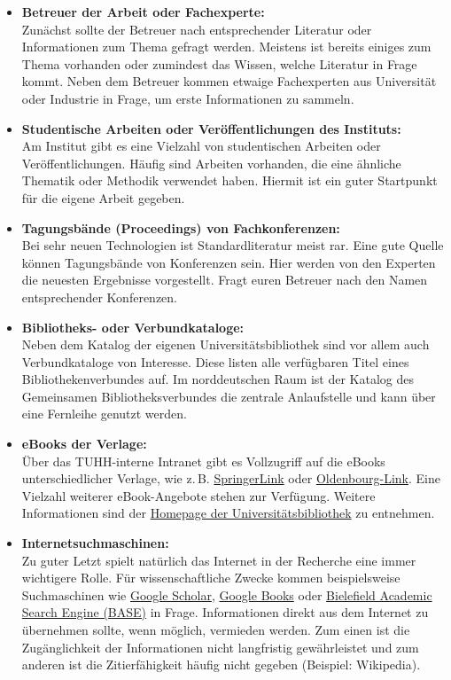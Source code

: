\begin{itemize}
    \item \textbf{Betreuer der Arbeit oder Fachexperte:} \\
          Zunächst sollte der Betreuer nach entsprechender Literatur oder Informationen zum Thema gefragt werden. Meistens ist bereits einiges zum Thema vorhanden oder zumindest das Wissen, welche Literatur in Frage kommt. Neben dem Betreuer kommen etwaige Fachexperten aus Universität oder Industrie in Frage, um erste Informationen zu sammeln.
    \item \textbf{Studentische Arbeiten oder Veröffentlichungen des Instituts:} \\
          Am Institut gibt es eine Vielzahl von studentischen Arbeiten oder Veröffentlichungen. Häufig sind Arbeiten vorhanden, die eine ähnliche Thematik oder Methodik verwendet haben. Hiermit ist ein guter Startpunkt für die eigene Arbeit gegeben.
    \item \textbf{Tagungsbände (Proceedings) von Fachkonferenzen:} \\
          Bei sehr neuen Technologien ist Standardliteratur meist rar. Eine gute Quelle können Tagungsbände von Konferenzen sein. Hier werden von den Experten die neuesten Ergebnisse vorgestellt. Fragt euren Betreuer nach den Namen entsprechender Konferenzen.
    \item \textbf{Bibliotheks- oder Verbundkataloge:} \\
          Neben dem Katalog der eigenen Universitätsbibliothek \cite{TUB} sind vor allem auch Verbundkataloge von Interesse. Diese listen alle verfügbaren Titel eines Bibliothekenverbundes auf. Im norddeutschen Raum ist der Katalog des Gemeinsamen Bibliotheksverbundes \cite{GBV} die zentrale Anlaufstelle und kann über eine Fernleihe genutzt werden.
    \item \textbf{eBooks der Verlage:} \\
          Über das TUHH-interne Intranet gibt es Vollzugriff auf die eBooks unterschiedlicher Verlage, wie z.\,B. \href{www.springerlink.com}{SpringerLink} oder \href{www.oldenbourg-link.com}{Oldenbourg-Link}. Eine Vielzahl weiterer eBook-Angebote stehen zur Verfügung. Weitere Informationen sind der \href{www.tub.tu-harburg.de}{Homepage der Universitätsbibliothek} zu entnehmen.
    \item \textbf{Internetsuchmaschinen:} \\
          Zu guter Letzt spielt natürlich das Internet in der Recherche eine immer wichtigere Rolle. Für wissenschaftliche Zwecke kommen beispielsweise Suchmaschinen wie \href{scholar.google.de}{Google Scholar}, \href{books.google.de}{Google Books} oder \href{base.ub.uni-bielefeld.de}{Bielefield Academic Search Engine (BASE)} in Frage. Informationen direkt aus dem Internet zu übernehmen sollte, wenn möglich, vermieden werden. Zum einen ist die Zugänglichkeit der Informationen nicht langfristig gewährleistet und zum anderen ist die Zitierfähigkeit häufig nicht gegeben (Beispiel: Wikipedia).
\end{itemize}

